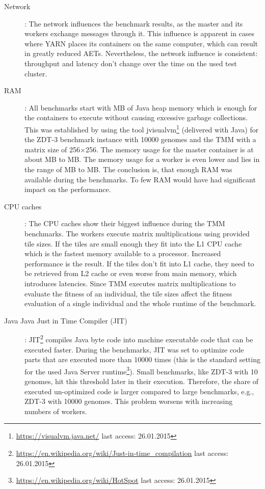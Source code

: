\begin{description}
  \item [Network]: The network influences the benchmark results, as the master and its workers exchange messages through it. This influence is apparent in cases where YARN places its containers on the same computer, which can result in greatly reduced AETs. Nevertheless, the network influence is consistent: throughput and latency don't change over the time on the used test cluster.
  \item [RAM]: All benchmarks start with \unit[256]{MB} of Java heap memory which is enough for the containers to execute without causing excessive garbage collections. This was established by using the tool jvisualvm\footnote{\url{https://visualvm.java.net/} last access: 26.01.2015} (delivered with Java) for the ZDT-3 benchmark instance with 10000 genomes and the TMM with a matrix size of 256$\times$256. The memory usage for the master container is at about \unit[100]{MB} to \unit[150]{MB}. The memory usage for a worker is even lower and lies in the range of \unit[5]{MB} to \unit[30]{MB}. The conclusion is, that enough RAM was available during the benchmarks. To few RAM would have had significant impact on the performance.
  \item [CPU caches]: The CPU caches show their biggest influence during the TMM benchmarks. The workers execute matrix multiplications using provided tile sizes. If the tiles are small enough they fit into the L1 CPU cache which is the fastest memory available to a processor. Increased performance is the result. If the tiles don't fit into L1 cache, they need to be retrieved from L2 cache or even worse from main memory, which introduces latencies. Since TMM executes matrix multiplications to evaluate the fitness of an individual, the tile sizes affect the fitness evaluation of a single individual and the whole runtime of the benchmark.
  \item [Java Java Just in Time Compiler (JIT)]: JIT\footnote{\url{https://en.wikipedia.org/wiki/Just-in-time_compilation} last access: 26.01.2015} compiles Java byte code into machine executable code that can be executed faster. During the benchmarks, JIT was set to optimize code parts that are executed more than 10000 times (this is the standard setting for the used Java Server runtime\footnote{\url{https://en.wikipedia.org/wiki/HotSpot} last access: 26.01.2015}). Small benchmarks, like ZDT-3 with 10 genomes, hit this threshold later in their execution. Therefore, the share of executed un-optimized code is larger compared to large benchmarks, e.g., ZDT-3 with 10000 genomes. This problem worsens with increasing numbers of workers.

\end{description}

